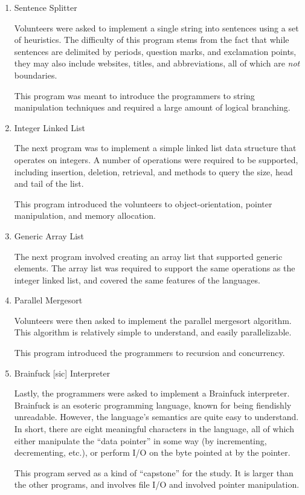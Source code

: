 \documentclass[draftcopy]{srpaper}
\begin{document}
\begin{enumerate}

\item Sentence Splitter

Volunteers were asked to implement a single string into sentences using a set
of heuristics. The difficulty of this program stems from the fact that
while sentences are delimited by periods, question marks, and exclamation
points, they may also include websites, titles, and abbreviations, all of
which are \textit{not} boundaries.

This program was meant to introduce the programmers to string manipulation
techniques and required a large amount of logical branching.

\item Integer Linked List

The next program was to implement a simple linked list data structure that
operates on integers. A number of operations were required to be supported,
including insertion, deletion, retrieval, and methods to query the size, head
and tail of the list.

This program introduced the volunteers to object-orientation, pointer
manipulation, and memory allocation.

\item Generic Array List

The next program involved creating an array list that supported generic
elements. The array list was required to support the same operations as the
integer linked list, and covered the same features of the languages.

\item Parallel Mergesort

Volunteers were then asked to implement the parallel mergesort algorithm. This
algorithm is relatively simple to understand, and easily parallelizable.

This program introduced the programmers to recursion and concurrency.

\item Brainfuck [sic] Interpreter

Lastly, the programmers were asked to implement a Brainfuck interpreter.
Brainfuck is an esoteric programming language, known for being fiendishly
unreadable. However, the language's semantics are quite easy to understand. In
short, there are eight meaningful characters in the language, all of which
either manipulate the ``data pointer'' in some way (by incrementing,
decrementing, etc.), or perform I/O on the byte pointed at by the pointer.

This program served as a kind of ``capstone'' for the study. It is larger than
the other programs, and involves file I/O and involved pointer manipulation.

\end{enumerate}
\end{document}
